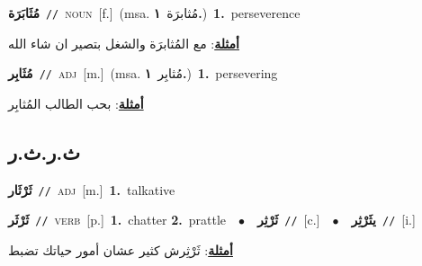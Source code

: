 \documentclass[10pt,a4paper,twoside]{article} %
\begin{document}
\begin{multicols}{2}
{\setlength\topsep{0pt}\textbf{\foreignlanguage{arabic}{مُثَابَرَة}}\ {\color{gray}\texttt{//}\color{black}}\ \textsc{noun}\ [f.]\ \color{gray}(msa. \foreignlanguage{arabic}{مُثابرَة}~\foreignlanguage{arabic}{\textbf{١.}})\color{black}\ \textbf{1.}~perseverence\  \begin{flushright}\color{gray}\foreignlanguage{arabic}{\textbf{\underline{\foreignlanguage{arabic}{أمثلة}}}: مع المُثابرَة والشغل بتصير ان شاء الله}\end{flushright}\color{black}} \vspace{2mm}

{\setlength\topsep{0pt}\textbf{\foreignlanguage{arabic}{مُثَابِر}}\ {\color{gray}\texttt{//}\color{black}}\ \textsc{adj}\ [m.]\ \color{gray}(msa. \foreignlanguage{arabic}{مُثابِر}~\foreignlanguage{arabic}{\textbf{١.}})\color{black}\ \textbf{1.}~persevering\  \begin{flushright}\color{gray}\foreignlanguage{arabic}{\textbf{\underline{\foreignlanguage{arabic}{أمثلة}}}: بحب الطالب المُثابِر}\end{flushright}\color{black}} \vspace{2mm}

\vspace{-3mm}
\subsection*{\color{blue}\foreignlanguage{arabic}{ث.ر.ث.ر}\color{blue}{}} 

{\setlength\topsep{0pt}\textbf{\foreignlanguage{arabic}{ثَرْثَار}}\ {\color{gray}\texttt{//}\color{black}}\ \textsc{adj}\ [m.]\ \textbf{1.}~talkative\ } \vspace{2mm}

{\setlength\topsep{0pt}\textbf{\foreignlanguage{arabic}{ثَرْثَر}}\ {\color{gray}\texttt{//}\color{black}}\ \textsc{verb}\ [p.]\ \textbf{1.}~chatter  \textbf{2.}~prattle\ \ $\bullet$\ \ \setlength\topsep{0pt}\textbf{\foreignlanguage{arabic}{ثَرْثِر}}\ {\color{gray}\texttt{//}\color{black}}\ [c.]\ \ $\bullet$\ \ \setlength\topsep{0pt}\textbf{\foreignlanguage{arabic}{يثَرْثِر}}\ {\color{gray}\texttt{//}\color{black}}\ [i.]\  \begin{flushright}\color{gray}\foreignlanguage{arabic}{\textbf{\underline{\foreignlanguage{arabic}{أمثلة}}}: ثَرْثِرش كثير عشان أمور حياتك تضبط}\end{flushright}\color{black}} \vspace{2mm}


\end{multicols}
\end{document}
